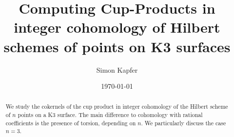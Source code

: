 \documentclass{amsart}
\DeclareMathOperator{\Hilb}{Hilb}
\newcommand{\IZ}{\mathbb{Z}}
\theoremstyle{plain}
\theoremstyle{definition}
\theoremstyle{remark}
\begin{document}
\title[Products in $H^\ast(\Hilb^n(K3), \IZ)$]{Computing Cup-Products in integer cohomology of Hilbert schemes of points on K3 surfaces}


\author{Simon Kapfer}
\address{Simon Kapfer, Lehrstuhl f\"ur Algebra und Zahlentheorie, Universit\"ats\-stra{\ss}e~14, D-86159 Augsburg}


\date{\today}



\begin{abstract} 
We study the cokernels of the cup 
product in integer cohomology of the Hilbert scheme of $n$ points on a K3 surface. The main difference to cohomology with rational coefficients is the presence of torsion, depending on $n$. We particularly discuss the case $n=3$.
\end{abstract}

\maketitle


\end{document}
